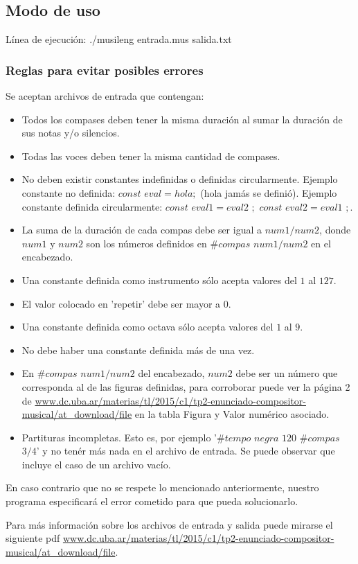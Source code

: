 \subsection{Modo de uso}
Línea de ejecución: ./musileng entrada.mus salida.txt

\subsubsection{Reglas para evitar posibles errores}
Se aceptan archivos de entrada que contengan:
\begin{itemize}
\item Todos los compases deben tener la misma duración al sumar la duración de sus notas y/o silencios.
\item Todas las voces deben tener la misma cantidad de compases.
\item No deben existir constantes indefinidas o definidas circularmente. Ejemplo constante no definida: $const$ $eval = hola;$ (hola jamás se definió). Ejemplo constante definida circularmente: $const$ $eval1 = eval2$ $;$ $const$ $eval2 = eval1$ $;$.
\item La suma de la duración de cada compas debe ser igual a $num1/num2$, donde $num1$ y $num2$ son los números definidos en $\#compas$ $num1/num2$ en el encabezado.
\item Una constante definida como instrumento sólo acepta valores del $1$ al $127$.
\item El valor colocado en 'repetir' debe ser mayor a $0$.
\item Una constante definida como octava sólo acepta valores del $1$ al $9$.
\item No debe haber una constante definida más de una vez.
\item En $\#compas$ $num1/num2$ del encabezado, $num2$ debe ser un número que corresponda al de las figuras definidas, para corroborar puede ver la página 2 de \url{www.dc.uba.ar/materias/tl/2015/c1/tp2-enunciado-compositor-musical/at_download/file} en la tabla Figura y Valor numérico asociado.
\item Partituras incompletas. Esto es, por ejemplo '$\#tempo$ $negra$ $120$ $\#compas$ $3/4$' y no tenér más nada en el archivo de entrada. Se puede observar que incluye el caso de un archivo vacío.
\end{itemize}
En caso contrario que no se respete lo mencionado anteriormente, nuestro programa especificará el error cometido para que pueda solucionarlo.

Para más información sobre los archivos de entrada y salida puede mirarse el siguiente pdf \url{www.dc.uba.ar/materias/tl/2015/c1/tp2-enunciado-compositor-musical/at_download/file}.

